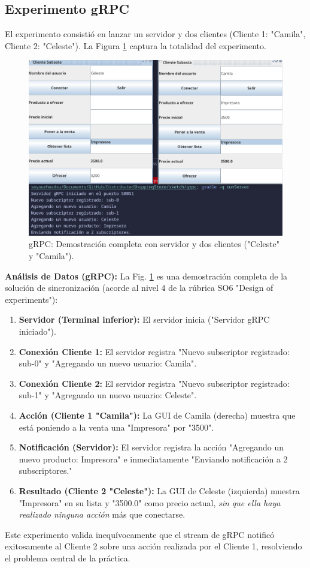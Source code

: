 \documentclass[11pt, a4paper]{article}
\begin{document}
\subsection{Experimento gRPC}
El experimento consistió en lanzar un servidor y dos clientes (Cliente 1: "Camila", Cliente 2: "Celeste"). La Figura \ref{fig:grpc_full} captura la totalidad del experimento.

\begin{figure}[h!]
    \centering
    \includegraphics[width=1.0\linewidth]{media/grpc-screenshots/Two-Clients+Server-Output.png}
    \caption{gRPC: Demostración completa con servidor y dos clientes ("Celeste" y "Camila").}
    \label{fig:grpc_full}
\end{figure}

\textbf{Análisis de Datos (gRPC):} La Fig. \ref{fig:grpc_full} es una demostración completa de la solución de sincronización (acorde al nivel 4 de la rúbrica SO6 "Design of experiments"):
\begin{enumerate}
    \item \textbf{Servidor (Terminal inferior):} El servidor inicia ("Servidor gRPC iniciado").
    \item \textbf{Conexión Cliente 1:} El servidor registra "Nuevo subscriptor registrado: sub-0" y "Agregando un nuevo usuario: Camila".
    \item \textbf{Conexión Cliente 2:} El servidor registra "Nuevo subscriptor registrado: sub-1" y "Agregando un nuevo usuario: Celeste".
    \item \textbf{Acción (Cliente 1 "Camila"):} La GUI de Camila (derecha) muestra que está poniendo a la venta una "Impresora" por "3500".
    \item \textbf{Notificación (Servidor):} El servidor registra la acción "Agregando un nuevo producto: Impresora" e inmediatamente "Enviando notificación a 2 subscriptores."
    \item \textbf{Resultado (Cliente 2 "Celeste"):} La GUI de Celeste (izquierda) muestra "Impresora" en su lista y "3500.0" como precio actual, \textit{sin que ella haya realizado ninguna acción} más que conectarse.
\end{enumerate}
Este experimento valida inequívocamente que el stream de gRPC notificó exitosamente al Cliente 2 sobre una acción realizada por el Cliente 1, resolviendo el problema central de la práctica.
\end{document}
